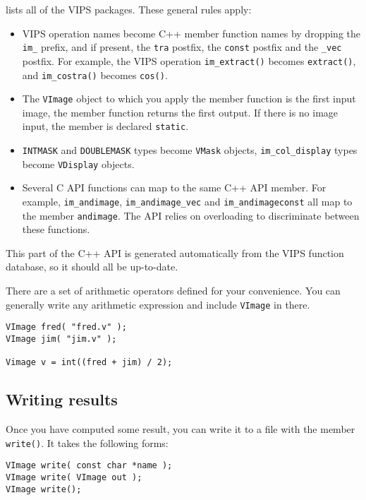  lists all of the VIPS packages. These general
rules apply:

\begin{itemize}

\item
VIPS operation names become C++ member function names by dropping the
\verb+im_+ prefix, and if present, the \verb+tra+ postfix, the \verb+const+
postfix and the \verb+_vec+ postfix. For example, the
VIPS operation \verb+im_extract()+ becomes \verb+extract()+, and
\verb+im_costra()+ becomes \verb+cos()+.

\item
The \verb+VImage+ object to which you apply the member function is the first
input image, the member function returns the first output. If there is no
image input, the member is declared \verb+static+.

\item
\verb+INTMASK+ and \verb+DOUBLEMASK+ types become \verb+VMask+ objects,
\verb+im_col_display+ types become \verb+VDisplay+ objects.

\item
Several C API functions can map to the same C++ API member. For example,
\verb+im_andimage+, \verb+im_andimage_vec+ and \verb+im_andimageconst+ all map
to the member \verb+andimage+. The API relies on overloading to
discriminate between these functions.

\end{itemize}

This part of the C++ API is generated automatically from the VIPS function
database, so it should all be up-to-date.

There are a set of arithmetic operators defined for your convenience. You can
generally write any arithmetic expression and include \verb+VImage+ in there.

\begin{verbatim}
VImage fred( "fred.v" );
VImage jim( "jim.v" );

Vimage v = int((fred + jim) / 2);
\end{verbatim}

\subsection{Writing results}

Once you have computed some result, you can write it to a file with the member
\verb+write()+. It takes the following forms:

\begin{verbatim}
VImage write( const char *name );
VImage write( VImage out );
VImage write();
\end{verbatim}

